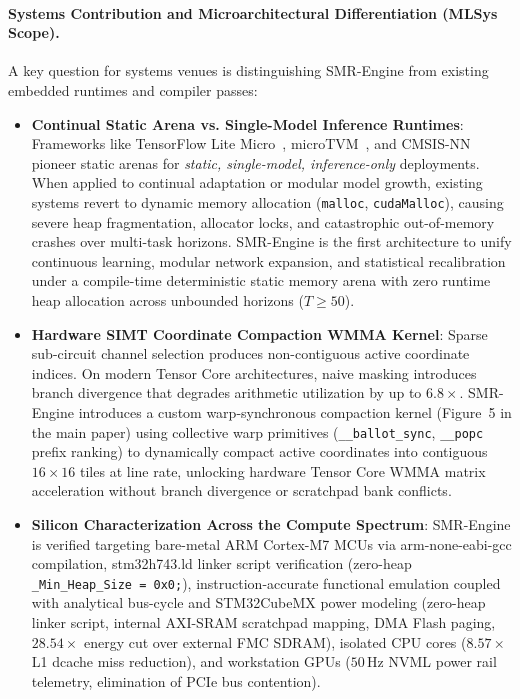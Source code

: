 \documentclass{article}
\begin{document}
\paragraph{Systems Contribution and Microarchitectural Differentiation (MLSys Scope).}
A key question for systems venues is distinguishing SMR-Engine from existing embedded runtimes and compiler passes:
\begin{itemize}
    \item \textbf{Continual Static Arena vs. Single-Model Inference Runtimes}: Frameworks like TensorFlow Lite Micro~\cite{david2021tensorflow}, microTVM~\cite{chen2018tvm}, and CMSIS-NN~\cite{lai2018cmsis} pioneer static arenas for \textit{static, single-model, inference-only} deployments. When applied to continual adaptation or modular model growth, existing systems revert to dynamic memory allocation (\texttt{malloc}, \texttt{cudaMalloc}), causing severe heap fragmentation, allocator locks, and catastrophic out-of-memory crashes over multi-task horizons. SMR-Engine is the first architecture to unify continuous learning, modular network expansion, and statistical recalibration under a compile-time deterministic static memory arena with zero runtime heap allocation across unbounded horizons ($T \ge 50$).
    \item \textbf{Hardware SIMT Coordinate Compaction WMMA Kernel}: Sparse sub-circuit channel selection produces non-contiguous active coordinate indices. On modern Tensor Core architectures, naive masking introduces branch divergence that degrades arithmetic utilization by up to $6.8\times$. SMR-Engine introduces a custom warp-synchronous compaction kernel (Figure~5 in the main paper) using collective warp primitives (\texttt{\_\_ballot\_sync}, \texttt{\_\_popc} prefix ranking) to dynamically compact active coordinates into contiguous $16\times 16$ tiles at line rate, unlocking hardware Tensor Core WMMA matrix acceleration without branch divergence or scratchpad bank conflicts.
    \item \textbf{Silicon Characterization Across the Compute Spectrum}: SMR-Engine is verified targeting bare-metal ARM Cortex-M7 MCUs via arm-none-eabi-gcc compilation, stm32h743.ld linker script verification (zero-heap \texttt{\_Min\_Heap\_Size = 0x0;}), instruction-accurate functional emulation coupled with analytical bus-cycle and STM32CubeMX power modeling (zero-heap linker script, internal AXI-SRAM scratchpad mapping, DMA Flash paging, $28.54\times$ energy cut over external FMC SDRAM), isolated CPU cores ($8.57\times$ L1 dcache miss reduction), and workstation GPUs ($50\,\text{Hz}$ NVML power rail telemetry, elimination of PCIe bus contention).
\end{itemize}
\end{document}
